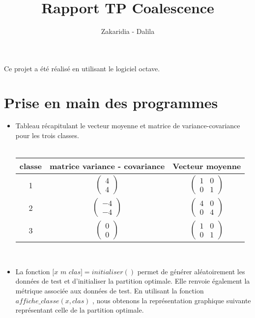 \documentclass[a4paper,11pt]{article}
\author{Zakaridia - Dalila}
\title{Rapport TP Coalescence}
\begin{document}
\maketitle
Ce projet a été réalisé en utilisant le logiciel octave.

\section{Prise en main des programmes}

\begin{itemize}

\item Tableau récapitulant le vecteur moyenne et matrice de variance-covariance pour les trois classes. \\\\
	\begin{tabular}{|c|c|c|}
		\hline
		classe  & matrice variance - covariance & Vecteur moyenne 
	\\
		\hline %
		1 &
		  $\begin{pmatrix} 4 \\ 4 \end{pmatrix}$
		& $\begin{pmatrix} 1 & 0\\ 0 & 1 \end{pmatrix}$ \\	
		
		
				\hline %
		2 &
		  $\begin{pmatrix} -4 \\ -4 \end{pmatrix}$
		& $\begin{pmatrix} 4 & 0\\ 0 & 4 \end{pmatrix}$ \\	
		
		
				\hline %
		3 &
		  $\begin{pmatrix} 0 \\ 0 \end{pmatrix}$
		& $\begin{pmatrix} 1 & 0\\ 0 & 1 \end{pmatrix}$ \\	
		\hline
		
		
	\end{tabular} \\

\item
	La fonction $[x$ $m$ $clas] = initialiser()$ permet de générer aléatoirement les données de test et d'initialiser la partition optimale. Elle renvoie également la métrique associée aux données de test. En utilisant la fonction $affiche\_classe(x,clas)$ , nous obtenons la représentation graphique suivante représentant celle de la partition optimale. 


\end{itemize}
\end{document}
